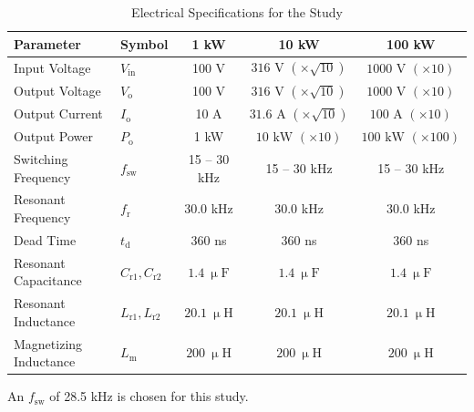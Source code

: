 \begin{table}[h!]
\centering
\caption{Electrical Specifications for the Study}
\label{tab:power_electrical}
\begin{threeparttable}
\begin{tabular}{llccc}
\hline
\hline
\textbf{Parameter} & \textbf{Symbol} & \textbf{1 kW} & \textbf{10 kW} & \textbf{100 kW} \\
\hline
Input Voltage & $V_{\mathrm{in}}$ & 100 V & $316\text{ V } (\times\sqrt{10})$ & $1000\text{ V } (\times 10)$ \\
Output Voltage & $V_{\mathrm{o}}$ & 100 V & $316\text{ V } (\times\sqrt{10})$ & $1000\text{ V } (\times 10)$ \\
Output Current & $I_{\mathrm{o}}$ & 10 A & $31.6\text{ A } (\times\sqrt{10})$ & $100\text{ A } (\times 10)$ \\
Output Power & $P_{\mathrm{o}}$ & 1 kW & $10\text{ kW } (\times 10)$ & $100\text{ kW } (\times 100)$ \\
Switching Frequency\tnote{a}& $f_{\mathrm{sw}}$ & 15 -- 30 kHz & 15 -- 30 kHz & 15 -- 30 kHz \\
Resonant Frequency & $f_{\mathrm{r}}$ & 30.0 kHz & 30.0 kHz & 30.0 kHz \\
Dead Time & $t_{\mathrm{d}}$ & 360 ns & 360 ns & 360 ns \\
Resonant Capacitance & $C_{\mathrm{r1}}, C_{\mathrm{r2}}$ & $1.4~\upmu\text{F}$ & $1.4~\upmu\text{F}$ & $1.4~\upmu\text{F}$ \\
Resonant Inductance & $L_{\mathrm{r1}}, L_{\mathrm{r2}}$ & $20.1~\upmu\text{H}$ & $20.1~\upmu\text{H}$ & $20.1~\upmu\text{H}$ \\
Magnetizing Inductance & $L_{\mathrm{m}}$ & $200~\upmu\text{H}$ & $200~\upmu\text{H}$ & $200~\upmu\text{H}$ \\
\hline
\hline
\end{tabular}

\begin{tablenotes}
\small
\item[a] An $f_\mathrm{sw}$ of 28.5 kHz is chosen for this study.
\end{tablenotes}
\end{threeparttable}
\end{table}